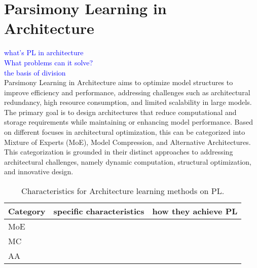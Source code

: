 \section{Parsimony Learning in Architecture}
\textcolor{blue}{what's PL in architecture}\\
\textcolor{blue}{What problems can it solve?}\\
\textcolor{blue}{the basis of division}\\
Parsimony Learning in Architecture aims to optimize model structures to improve efficiency and performance, addressing challenges such as architectural redundancy, high resource consumption, and limited scalability in large models. The primary goal is to design architectures that reduce computational and storage requirements while maintaining or enhancing model performance. Based on different focuses in architectural optimization, this can be categorized into Mixture of Experts (MoE), Model Compression, and Alternative Architectures. This categorization is grounded in their distinct approaches to addressing architectural challenges, namely dynamic computation, structural optimization, and innovative design.

\begin{table}[t]
\footnotesize
\centering
\tabcolsep=2pt
\caption{Characteristics for Architecture learning methods on PL.}
\begin{tabular}{l|c|c}
\toprule
Category &specific characteristics &how they achieve PL \\
\midrule
MoE & &\\
\midrule
MC & &\\
\midrule
AA & & \\
\bottomrule
\end{tabular}
\label{table4}
\end{table}

